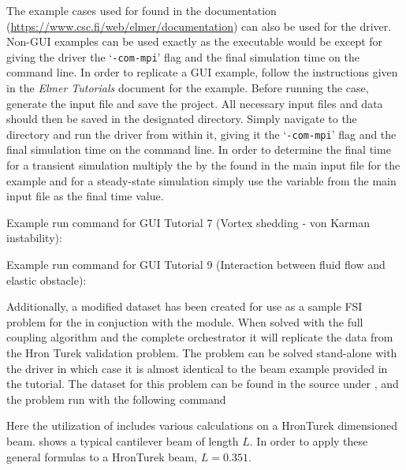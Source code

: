 The example cases used for \elmer found in the documentation (\url{https://www.csc.fi/web/elmer/documentation}) can also be used for the \irprogram driver. Non-GUI examples can be used exactly as the \elmer executable would be except for giving the driver the `\texttt{-com-mpi}' flag and the final simulation time on the command line. In order to replicate a GUI example, follow the instructions given in the \textit{Elmer Tutorials} document for the example. Before running the case, generate the input file and save the project. All necessary input files and data should then be saved in the designated directory. Simply navigate to the directory and run the driver from within it, giving it the `\texttt{-com-mpi}' flag and the final simulation time on the command line. In order to determine the final time for a transient simulation multiply the  by the  found in the main input file for the example and for a steady-state simulation simply use the  variable from the main input file as the final time value.

Example run command for GUI Tutorial 7 (Vortex shedding - von Karman instability):


Example run command for GUI Tutorial 9 (Interaction between fluid flow and elastic obstacle):


Additionally, a modified dataset has been created for use as a sample FSI problem for the \irprogram in conjuction with the \foam module. When solved with the full coupling algorithm and the complete orchestrator it will replicate the data from the Hron Turek validation problem. The problem can be solved stand-alone with the \irprogram driver in which case it is almost identical to the beam example provided in the \elmer tutorial. The dataset for this problem can be found in the \irprogram source under , and the problem run with the following command



Here the utilization of \elmer includes various calculations on a HronTurek dimensioned beam.  shows a typical cantilever beam of length $ L $. In order to apply these general formulas to a HronTurek beam, $ L = 0.351 $.

